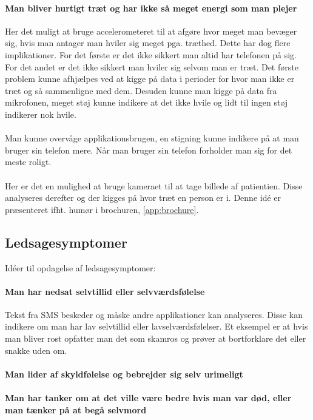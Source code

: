 \paragraph{Man bliver hurtigt træt og har ikke så meget energi som man plejer}
Her det muligt at bruge accelerometeret til at afgøre hvor meget man bevæger sig, hvis man antager man hviler sig meget pga. træthed. Dette har dog flere implikationer. For det første er det ikke sikkert man altid har telefonen på sig. For det andet er det ikke sikkert man hviler sig selvom man er træt.
Det første problem kunne afhjælpes ved at kigge på data i perioder for hvor man ikke er træt og så sammenligne med dem.
Desuden kunne man kigge på data fra mikrofonen, meget støj kunne indikere at det ikke hvile og lidt til ingen støj indikerer nok hvile.
\\
\\
Man kunne overvåge applikationsbrugen, en stigning kunne indikere på at man bruger sin telefon mere. Når man bruger sin telefon forholder man sig for det meste roligt.
\\
\\
Her er det en mulighed at bruge kameraet til at tage billede af patientien. Disse analyseres derefter og der kigges på hvor træt en person er i. Denne idé er præsenteret ifht. humør i brochuren, \cref{app:brochure}.

\subsection{Ledsagesymptomer}
Idéer til opdagelse af ledsagesymptomer:
\paragraph{Man har nedsat selvtillid eller selvværdsfølelse}
Tekst fra SMS beskeder og måske andre applikationer kan analyseres. Disse kan indikere om man har lav selvtillid eller lavselværdsfølelser. Et eksempel er at hvis man bliver rost opfatter man det som skamros og prøver at bortforklare det eller snakke uden om.\cite{selvtillid}

\paragraph{Man lider af skyldfølelse og bebrejder sig selv urimeligt}
\paragraph{Man har tanker om at det ville være bedre hvis man var død, eller man tænker på at begå selvmord}

